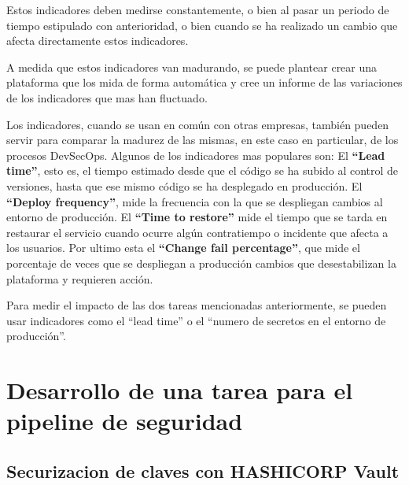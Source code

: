 \documentclass[12pt]{report} %
\begin{document}
Estos indicadores deben medirse constantemente, o bien al pasar un periodo de
tiempo estipulado con anterioridad, o bien cuando se ha realizado un cambio que
afecta directamente estos indicadores.

A medida que estos indicadores van madurando, se puede plantear crear una
plataforma que los mida de forma automática y cree un informe de las variaciones
de los indicadores que mas han fluctuado.

Los indicadores, cuando se usan en común con otras empresas, también pueden
servir para comparar la madurez de las mismas, en este caso en particular, de
los procesos \gls{DevSecOps}.
Algunos de los indicadores mas populares son:
El \textbf{``Lead time''}, esto es, el tiempo estimado desde que el código se ha subido
al control de versiones, hasta que ese mismo código se ha desplegado en
producción.
El \textbf{``Deploy frequency''}, mide la frecuencia con la que se despliegan
cambios al entorno de producción.
El \textbf{``Time to restore''} mide el tiempo que se tarda en restaurar el
servicio cuando ocurre algún contratiempo o incidente que afecta a los usuarios.
Por ultimo esta el \textbf{``Change fail percentage''}, que mide el porcentaje
de veces que se despliegan a producción cambios que desestabilizan la plataforma
y requieren acción.

Para medir el impacto de las dos tareas mencionadas anteriormente, se pueden
usar indicadores como el ``lead time'' o el ``numero de secretos en el entorno de
producción''.


\chapter{Desarrollo de una tarea para el pipeline de seguridad}

\section{Securizacion de claves con HASHICORP Vault}




\end{document}
